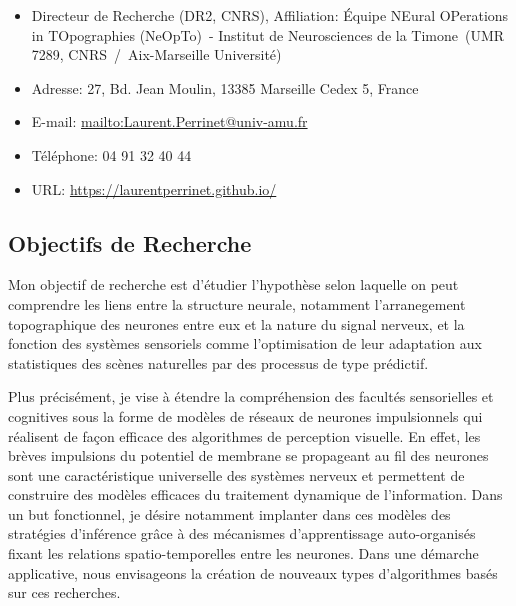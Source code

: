 \documentclass[10pt,french,a4paper,oneside]{article}%
\makeatletter
\newcommand{\Team}{\'Equipe NEural OPerations in TOpographies (NeOpTo)}%
\newcommand{\Institute}{Institut de Neurosciences de la Timone}%
\newcommand{\InstituteUMR}{UMR 7289, CNRS~/~Aix-Marseille Université}%
\newcommand{\Address}{27, Bd. Jean Moulin, 13385 Marseille Cedex 5, France}
\newcommand{\Website}{https://laurentperrinet.github.io/}
\newcommand{\Email}{Laurent.Perrinet@univ-amu.fr}
\makeatother
\begin{document}
\begin{itemize}
\item Directeur de Recherche (DR2, CNRS), Affiliation: \Team\ - \Institute\ (\InstituteUMR)
\item Adresse: \Address
\item E-mail: \url{mailto:\Email}
\item Téléphone: 04 91 32 40 44
\item URL: \url{\Website}
\end{itemize}


\subsection*{Objectifs de Recherche}

Mon objectif de recherche est d'étudier l'hypothèse selon laquelle on peut comprendre les liens entre la structure neurale, notamment l'arranegement topographique des neurones entre eux et la nature du signal nerveux, et la fonction des systèmes sensoriels comme l'optimisation de leur adaptation aux statistiques des scènes naturelles par des processus de type prédictif.

Plus précisément, je vise à étendre la compréhension des facultés sensorielles et cognitives sous la forme de modèles de réseaux de neurones impulsionnels qui réalisent de façon efficace des algorithmes de  perception visuelle. En effet, les brèves impulsions du potentiel de membrane se propageant au fil des neurones sont une caractéristique universelle des systèmes nerveux et permettent de construire des modèles efficaces du traitement dynamique de l'information. Dans un but fonctionnel, je désire notamment implanter dans ces modèles des stratégies d'inférence grâce à des mécanismes d'apprentissage auto-organisés fixant les relations spatio-temporelles entre les neurones. Dans une démarche applicative, nous envisageons la création de nouveaux types d'algorithmes basés sur ces recherches.
\end{document}
